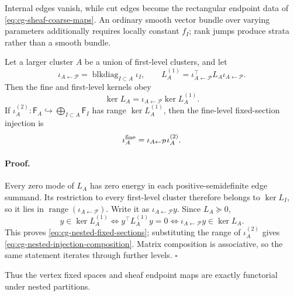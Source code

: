 Internal edges vanish, while cut edges become the
rectangular endpoint data of \eqref{eq:cg-sheaf-coarse-maps}. An ordinary
smooth vector bundle over varying parameters additionally requires locally
constant \(f_I\); rank jumps produce strata rather than a smooth bundle.

Let a larger cluster \(A\) be a union of first-level clusters, and let
\begin{equation}
\iota_{A\leftarrow\mathcal P}
=\operatorname{blkdiag}_{I\subset A}\iota_I,
\qquad
L_A^{(1)}
=\iota_{A\leftarrow\mathcal P}^\top L_A
\iota_{A\leftarrow\mathcal P}.
\label{eq:cg-nested-first-compression}
\end{equation}
Then the fine and first-level kernels obey
\begin{equation}
\ker L_A
=\iota_{A\leftarrow\mathcal P}\ker L_A^{(1)}.
\label{eq:cg-nested-fixed-sections}
\end{equation}
If
\(\iota_A^{(2)}:\mathsf F_A\hookrightarrow
\bigoplus_{I\subset A}\mathsf F_I\) has range \(\ker L_A^{(1)}\), then the
fine-level fixed-section injection is
\begin{equation}
\iota_A^{\rm fine}
=\iota_{A\leftarrow\mathcal P}\iota_A^{(2)}.
\label{eq:cg-nested-injection-composition}
\end{equation}

\paragraph{Proof.}
Every zero mode of \(L_A\) has zero energy in each positive-semidefinite
edge summand. Its restriction to every first-level cluster therefore belongs
to \(\ker L_I\), so it lies in
\(\operatorname{range}(\iota_{A\leftarrow\mathcal P})\). Write it as
\(\iota_{A\leftarrow\mathcal P}y\). Since \(L_A\succeq0\),
\begin{equation}
y\in\ker L_A^{(1)}
\Longleftrightarrow
y^\top L_A^{(1)}y=0
\Longleftrightarrow
\iota_{A\leftarrow\mathcal P}y\in\ker L_A.
\label{eq:cg-nested-kernel-equivalence}
\end{equation}
This proves \eqref{eq:cg-nested-fixed-sections}; substituting the range of
\(\iota_A^{(2)}\) gives \eqref{eq:cg-nested-injection-composition}. Matrix
composition is associative, so the same statement iterates through further
levels. \(\square\)

Thus the vertex fixed spaces and sheaf endpoint maps are exactly functorial
under nested partitions. 

